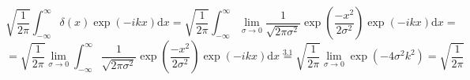 \documentclass[a4paper,11pt]{article}
\begin{document}
\subsection{}
\begin{equation}
        \sqrt{\frac{1}{2\pi}}\int_{-\infty}^\infty \delta(x) \exp(-ikx)\text{d}x = \sqrt{\frac{1}{2\pi}}\int_{-\infty}^\infty \lim_{\sigma \to 0}\frac{1}{\sqrt{2\pi\sigma^2}}\exp(\frac{-x^2}{2\sigma^2}) \exp(-ikx)\text{d}x = 
\end{equation}
\begin{equation}
        = \sqrt{\frac{1}{2\pi}}\lim_{\sigma \to 0}\int_{-\infty}^\infty \frac{1}{\sqrt{2\pi\sigma^2}}\exp(\frac{-x^2}{2\sigma^2}) \exp(-ikx)\text{d}x \overset{3.1}{=} \sqrt{\frac{1}{2\pi}}\lim_{\sigma \to 0} \exp(-4\sigma^2k^2) = \sqrt{\frac{1}{2\pi}}
\end{equation}
\end{document}
